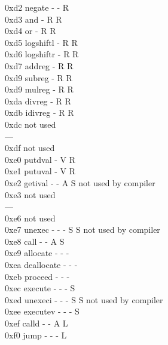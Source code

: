 \documentclass[11pt]{article}
\begin{document}
\begin{tabbing}
0xd2  \> negate		\> - \> - \> R \>   \>	 \>		\\
0xd3  \> and		\> - \> R \> R \>   \>	 \>		\\
0xd4  \> or		\> - \> R \> R \>   \>	 \>		\\
0xd5  \> logshiftl	\> - \> R \> R \>   \>	 \>		\\
0xd6  \> logshiftr	\> - \> R \> R \>   \>	 \>		\\
0xd7  \> addreg		\> - \> R \> R \>   \>	 \>		\\
0xd9  \> subreg		\> - \> R \> R \>   \>	 \>		\\
0xd9  \> mulreg		\> - \> R \> R \>   \>	 \>		\\
0xda  \> divreg		\> - \> R \> R \>   \>	 \>		\\
0xdb  \> idivreg	\> - \> R \> R \>   \>	 \>		\\
0xdc  \>		\>   \>   \>   \>   \>	 \> not used	\\
---   \>		\>   \>   \>   \>   \>   \>		\\
0xdf  \>		\>   \>   \>   \>   \>   \> not used	\\
0xe0  \> putdval	\> - \> V \> R \>   \>	 \>		\\
0xe1  \> putuval	\> - \> V \> R \>   \>	 \>		\\
0xe2  \> getival	\> - \> - \> A \> S \>   \> not used by compiler \\
0xe3  \>		\>   \>   \>   \>   \>	 \> not used	\\
---   \>		\>   \>   \>   \>   \>   \>		\\
0xe6  \>		\>   \>   \>   \>   \>   \> not used	\\
0xe7  \> unexec		\> - \> - \> - \> S \> S \> not used by compiler \\
0xe8  \> call		\> - \> - \> A \> S \>   \>		\\
0xe9  \> allocate	\> - \> - \> - \>   \>   \>		\\
0xea  \> deallocate	\> - \> - \> - \>   \>   \>		\\
0xeb  \> proceed	\> - \> - \> - \>   \>   \>		\\
0xec  \> execute	\> - \> - \> - \> S \>   \>		\\
0xed  \> unexeci	\> - \> - \> - \> S \> S \> not used by compiler \\
0xee  \> executev	\> - \> - \> - \> S \>   \>		\\
0xef  \> calld		\> - \> - \> A \> L \>   \>		\\
0xf0  \> jump		\> - \> - \> - \> L \>   \>		\\

\end{tabbing}
\end{document}
